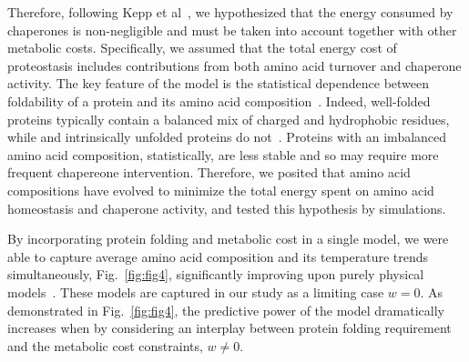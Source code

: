 \documentclass[10pt,letterpaper]{article}
\begin{document}
Therefore, following Kepp et al~\cite{Kepp2014Model}, we hypothesized that the energy consumed by chaperones is non-negligible and must be taken into account together with other metabolic costs. Specifically, we assumed that the total energy cost of proteostasis includes contributions from both amino acid turnover and chaperone activity. The key feature of the model is the statistical dependence between foldability of a protein and its amino acid composition~\cite{Dill1985Theory,Berezovsky2007Positive,Venev2015Massively}. Indeed, well-folded proteins typically  contain a balanced mix of charged and hydrophobic residues, while and intrinsically unfolded proteins do not~\cite{Uversky2000Why}. Proteins with an imbalanced amino acid composition, statistically, are less stable and so may require more frequent chapereone intervention. Therefore, we posited that amino acid compositions have evolved to minimize the total energy spent on amino acid homeostasis and chaperone activity, and tested this hypothesis by simulations.

By incorporating protein folding and metabolic cost in a single model, we were able to capture average amino acid composition and its temperature trends simultaneously, Fig.~\ref{fig:fig4}, significantly improving upon purely physical models~\cite{Berezovsky2007Positive,Venev2015Massively}. These  models are captured in our study as a limiting case $\mathit{w}=0$. As demonstrated in Fig.~\ref{fig:fig4}, the predictive power of the model dramatically increases when by considering an interplay between protein folding requirement and the metabolic cost constraints, $w\neq 0$.
\end{document}
